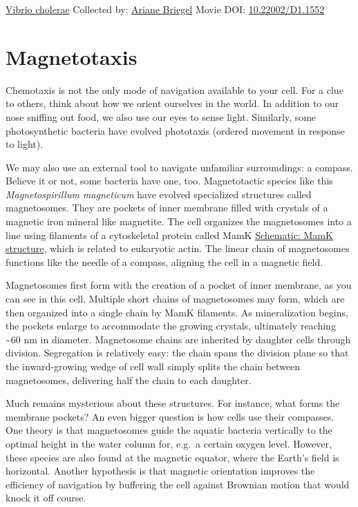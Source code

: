 \documentclass[]{tufte-book}
\begin{document}
\hypertarget{htmlwidget-35bb1a89b83874f8c985}{}

\label{fig:7-5a}\protect\hyperlink{tree}{Vibrio cholerae} Collected by: \protect\hyperlink{ariane_briegel}{Ariane Briegel} Movie DOI: \href{https://doi.org/10.22002/D1.1552}{10.22002/D1.1552}

\hypertarget{magnetotaxis}{%
\section{Magnetotaxis}\label{magnetotaxis}}

Chemotaxis is not the only mode of navigation available to your cell. For a clue to others, think about how we orient ourselves in the world. In addition to our nose sniffing out food, we also use our eyes to sense light. Similarly, some photosynthetic bacteria have evolved phototaxis (ordered movement in response to light).

We may also use an external tool to navigate unfamiliar surroundings: a compass. Believe it or not, some bacteria have one, too. Magnetotactic species like this \emph{Magnetospirillum magneticum} have evolved specialized structures called magnetosomes. They are pockets of inner membrane filled with crystals of a magnetic iron mineral like magnetite. The cell organizes the magnetosomes into a line using filaments of a cytoskeletal protein called MamK \protect\hyperlink{MamK_structure}{Schematic: MamK structure}, which is related to eukaryotic actin. The linear chain of magnetosomes functions like the needle of a compass, aligning the cell in a magnetic field.

Magnetosomes first form with the creation of a pocket of inner membrane, as you can see in this cell. Multiple short chains of magnetosomes may form, which are then organized into a single chain by MamK filaments. As mineralization begins, the pockets enlarge to accommodate the growing crystals, ultimately reaching \textasciitilde{}60 nm in diameter. Magnetosome chains are inherited by daughter cells through division. Segregation is relatively easy: the chain spans the division plane so that the inward-growing wedge of cell wall simply splits the chain between magnetosomes, delivering half the chain to each daughter.

Much remains mysterious about these structures. For instance, what forms the membrane pockets? An even bigger question is how cells use their compasses. One theory is that magnetosomes guide the aquatic bacteria vertically to the optimal height in the water column for, e.g.~a certain oxygen level. However, these species are also found at the magnetic equator, where the Earth's field is horizontal. Another hypothesis is that magnetic orientation improves the efficiency of navigation by buffering the cell against Brownian motion that would knock it off course.
\end{document}
